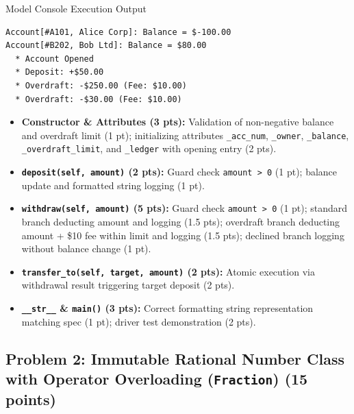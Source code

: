 \documentclass[11pt,a4paper]{article}
\begin{document}
\begin{solbox}{Model Console Execution Output}
\begin{verbatim}
Account[#A101, Alice Corp]: Balance = $-100.00
Account[#B202, Bob Ltd]: Balance = $80.00
  * Account Opened
  * Deposit: +$50.00
  * Overdraft: -$250.00 (Fee: $10.00)
  * Overdraft: -$30.00 (Fee: $10.00)
\end{verbatim}
\end{solbox}

\begin{rubricbox}
\begin{itemize}[leftmargin=1.5em,itemsep=1.5pt]
\item \textbf{Constructor \& Attributes (3 pts):} Validation of non-negative balance and overdraft limit (1 pt); initializing attributes \texttt{\_acc\_num}, \texttt{\_owner}, \texttt{\_balance}, \texttt{\_overdraft\_limit}, and \texttt{\_ledger} with opening entry (2 pts).
\item \textbf{\texttt{deposit(self, amount)} (2 pts):} Guard check \texttt{amount > 0} (1 pt); balance update and formatted string logging (1 pt).
\item \textbf{\texttt{withdraw(self, amount)} (5 pts):} Guard check \texttt{amount > 0} (1 pt); standard branch deducting amount and logging (1.5 pts); overdraft branch deducting amount + \$10 fee within limit and logging (1.5 pts); declined branch logging without balance change (1 pt).
\item \textbf{\texttt{transfer\_to(self, target, amount)} (2 pts):} Atomic execution via withdrawal result triggering target deposit (2 pts).
\item \textbf{\texttt{\_\_str\_\_} \& \texttt{main()} (3 pts):} Correct formatting string representation matching spec (1 pt); driver test demonstration (2 pts).
\end{itemize}
\end{rubricbox}

\newpage
\subsection*{Problem 2: Immutable Rational Number Class with Operator Overloading (\texttt{Fraction}) (15 points)}
\end{document}
